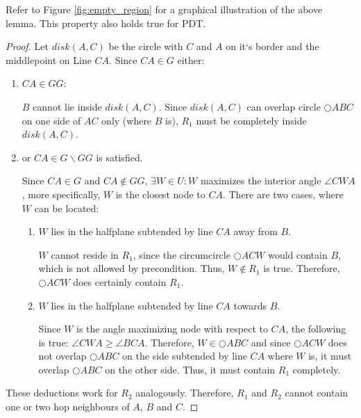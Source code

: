 Refer to Figure \ref{fig:empty_region} for a graphical illustration of the above lemma.
This property also holds true for PDT.


\begin{proof}
Let $disk(A, C) $ be the circle with $C $ and $A $ on it`s border and the middlepoint on Line $CA $.
Since $CA \in G $ either: 
\begin{enumerate}
\renewcommand{\labelenumi}{(\roman{enumi})}
\item $CA \in GG $:

$B $ cannot lie inside $disk(A, C) $. 
Since $disk(A, C) $ can overlap circle $\bigcirc{ABC} $ on one side of $AC $ only (where $B $ is), $R_1 $ must be completely inside $disk(A, C) $.
\item or $CA \in G\backslash GG $ is satisfied. 

Since $CA \in G $ and $CA \notin GG $, $\exists W\in U : W$ maximizes the interior angle $\angle{CWA}  $, more specifically, $W $ is the closest node to $CA $.
There are two cases, where $W $ can be located:
\begin{enumerate}
\renewcommand{\labelenumi}{(\alph{enumi})}
\item $W $ lies in the halfplane subtended by line $CA $ away from $B $.

$W $ cannot reside in $R_1 $, since the circumcircle $\bigcirc{ACW} $ would contain $B $, which is not allowed by precondition.
Thus, $W \notin R_1 $ is true.
Therefore, $\bigcirc{ACW} $ does certainly contain $R_1 $.

\item $W $ lies in the halfplane subtended by line $CA $ towards $B $.

Since $W $ is the angle maximizing node with respect to $CA $, the following is true: $\angle{CWA} \geq \angle{BCA} $.
Therefore, $W \in \bigcirc{ABC} $ and since $\bigcirc{ACW} $ does not overlap $\bigcirc{ABC} $ on the side subtended by line $CA $ where $W $ is, it must overlap $\bigcirc{ABC} $ on the other side.
Thus, it must contain $R_1 $ completely.

\end{enumerate} 


\end{enumerate}
These deductions work for $R_2 $ analogously.
Therefore, $R_1 $ and $R_2 $ cannot contain one or two hop neighbours of $A $, $B $ and $C $. 


\end{proof} 



